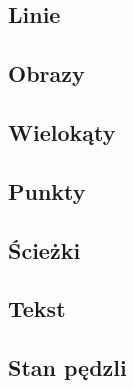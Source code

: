 \subsection{Linie}


\subsection{Obrazy}


\subsection{Wielokąty}


\subsection{Punkty}


\subsection{Ścieżki}


\subsection{Tekst}


\subsection{Stan pędzli}
